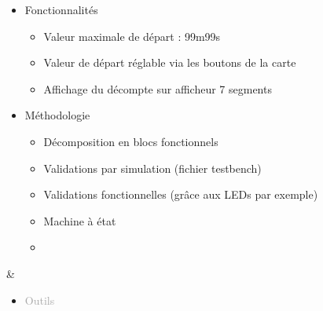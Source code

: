 \documentclass{article}
\begin{document}
\begin{tabular}
\begin{itemize}
\begin{itemize}
            \item \textcolor{gray!80}{Fonctionnalités}
            \begin{itemize}
                [label={\textcolor{gray!80}{$\triangleright$}}, topsep=0pt, partopsep=0pt, itemsep=0.5pt, parsep=2pt]
                \item \textcolor{gray!80}{Valeur maximale de départ : 99m99s}
                \item \textcolor{gray!80}{Valeur de départ réglable via les boutons de la carte}
                \item \textcolor{gray!80}{Affichage du décompte sur afficheur 7 segments}
            \end{itemize}
            \item \textcolor{gray!80}{Méthodologie}       
            \begin{itemize}
                [label={\textcolor{gray!80}{$\triangleright$}}, topsep=0pt, partopsep=0pt, itemsep=0.5pt, parsep=2pt]
                \item \textcolor{gray!80}{Décomposition en blocs fonctionnels}
                \item \textcolor{gray!80}{Validations par simulation (fichier testbench)}
                \item \textcolor{gray!80}{Validations fonctionnelles (grâce aux LEDs par exemple)}
                \item \textcolor{gray!80}{Machine à état}
                \item[\textcolor{white}{}] {} %
            \end{itemize}
        \end{itemize}
    \end{itemize}
    &
    \begin{itemize}
        [label={}, topsep=8pt, partopsep=0pt, itemsep=0.5pt, parsep=2pt,after=\vspace*{-\baselineskip}]
        \setlength{\itemsep}{10pt}
        \item \textcolor{darkGray}{Outils}
        \begin{itemize}
        [label={\textcolor{gray!80}{\checkmark}}, topsep=8pt, partopsep=0pt, itemsep=0.5pt, parsep=2pt,after=\vspace*{-\baselineskip}] 
            

\end{itemize}
\end{itemize}
\end{tabular}
\end{document}
